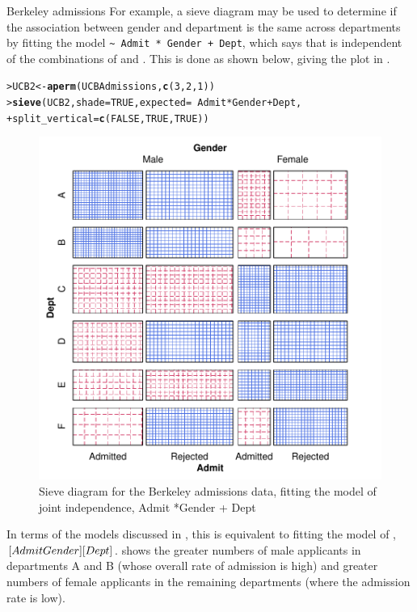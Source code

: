 \documentclass[10pt,krantz2]{krantz}\usepackage[]{graphicx}\usepackage[]{color}
\makeatletter
\newcommand{\hlnum}[1]{\textcolor[rgb]{0.686,0.059,0.569}{#1}}%
\newcommand{\hlopt}[1]{\textcolor[rgb]{0,0,0}{#1}}%
\newcommand{\hlstd}[1]{\textcolor[rgb]{0.345,0.345,0.345}{#1}}%
\newcommand{\hlkwb}[1]{\textcolor[rgb]{0.69,0.353,0.396}{#1}}%
\newcommand{\hlkwc}[1]{\textcolor[rgb]{0.333,0.667,0.333}{#1}}%
\newcommand{\hlkwd}[1]{\textcolor[rgb]{0.737,0.353,0.396}{\textbf{#1}}}%
\newenvironment{kframe}{%
 \def\at@end@of@kframe{}%
 \ifinner\ifhmode%
  \def\at@end@of@kframe{\end{minipage}}%
  \begin{minipage}{\columnwidth}%
 \fi\fi%
 \def\FrameCommand##1{\hskip\@totalleftmargin \hskip-\fboxsep
 \colorbox{shadecolor}{##1}\hskip-\fboxsep
     \hskip-\linewidth \hskip-\@totalleftmargin \hskip\columnwidth}%
 \MakeFramed {\advance\hsize-\width
   \@totalleftmargin\z@ \linewidth\hsize
   \@setminipage}}%
 {\par\unskip\endMakeFramed%
 \at@end@of@kframe}
\newenvironment{knitrout}{}{} %
\renewenvironment{knitrout}{\small\renewcommand{\baselinestretch}{.85}}{} %
\makeatother
\begin{document}
\begin{Example}[berkeley3]{Berkeley admissions}
For example, a sieve diagram may be used to determine if the association
between gender and department is the same across departments
by fitting the model \verb|~ Admit * Gender + Dept|, which
says that  is independent of the combinations of 
and .  This is done as shown below, giving the plot in
.

\begin{knitrout}
\color{fgcolor}\begin{kframe}
\begin{alltt}
\hlstd{> }\hlstd{UCB2} \hlkwb{<-} \hlkwd{aperm}\hlstd{(UCBAdmissions,} \hlkwd{c}\hlstd{(}\hlnum{3}\hlstd{,} \hlnum{2}\hlstd{,}\hlnum{1}\hlstd{))}
\hlstd{> }\hlkwd{sieve}\hlstd{(UCB2,} \hlkwc{shade} \hlstd{=} \hlnum{TRUE}\hlstd{,} \hlkwc{expected} \hlstd{=} \hlopt{~} \hlstd{Admit} \hlopt{*} \hlstd{Gender} \hlopt{+} \hlstd{Dept,}
\hlstd{+ }      \hlkwc{split_vertical} \hlstd{=} \hlkwd{c}\hlstd{(}\hlnum{FALSE}\hlstd{,} \hlnum{TRUE}\hlstd{,} \hlnum{TRUE}\hlstd{))}
\end{alltt}
\end{kframe}\begin{figure}[!htbp]

\centerline{\includegraphics[width=.6\textwidth]{ch04/fig/berkeley-sieve2-1} }

\caption[Sieve diagram for the Berkeley admissions data, fitting the model of joint independence, Admit *Gender + Dept]{Sieve diagram for the Berkeley admissions data, fitting the model of joint independence, Admit *Gender + Dept\label{fig:berkeley-sieve2}}
\end{figure}


\end{knitrout}
In terms of the \loglin models discussed in
, this is equivalent to fitting the model
of , $[AdmitGender] [Dept]$.
 shows the greater numbers of
male applicants in departments A and B
(whose overall rate of admission is high) and greater numbers of female
applicants in the remaining departments (where the admission rate is low).

\end{Example}
\end{document}
